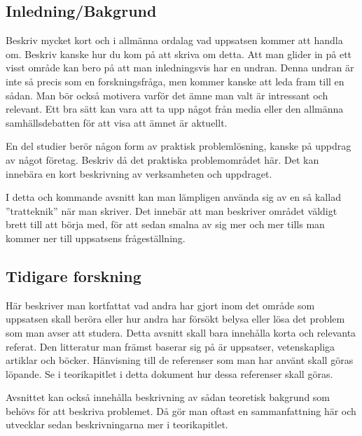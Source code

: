 \documentclass[a4paper,12pt]{article} %
\begin{document}
\subsection{Inledning/Bakgrund}
Beskriv mycket kort och i allmänna ordalag vad uppsatsen kommer att handla om. Beskriv kanske hur du kom på att skriva om detta. Att man glider in på ett visst område kan bero på att man inledningsvis har en undran. Denna undran är inte så precis som en forskningsfråga, men kommer kanske att leda fram till en sådan. Man bör också motivera varför det ämne man valt är intressant och relevant. Ett bra sätt kan vara att ta upp något från media eller den allmänna samhällsdebatten för att visa att ämnet är aktuellt.

En del studier berör någon form av praktisk problemlösning, kanske på uppdrag av något företag. Beskriv då det praktiska problemområdet här. Det kan innebära en kort beskrivning av verksamheten och uppdraget.

I detta och kommande avsnitt kan man lämpligen använda sig av en så kallad ”tratteknik” när man skriver. Det innebär att man beskriver området väldigt brett till att börja med, för att sedan smalna av sig mer och mer tills man kommer ner till uppsatsens frågeställning.

\subsection{Tidigare forskning}
Här beskriver man kortfattat vad andra har gjort inom det område som uppsatsen skall beröra eller hur andra har försökt belysa eller lösa det problem som man avser att studera. Detta avsnitt skall bara innehålla korta och relevanta referat. Den litteratur man främst baserar sig på är uppsatser, vetenskapliga artiklar och böcker. Hänvisning till de referenser som man har använt skall göras löpande. Se i teorikapitlet i detta dokument hur dessa referenser skall göras.

Avsnittet kan också innehålla beskrivning av sådan teoretisk bakgrund som behövs för att beskriva problemet. Då gör man oftast en sammanfattning här och utvecklar sedan beskrivningarna mer i teorikapitlet.
\end{document}
